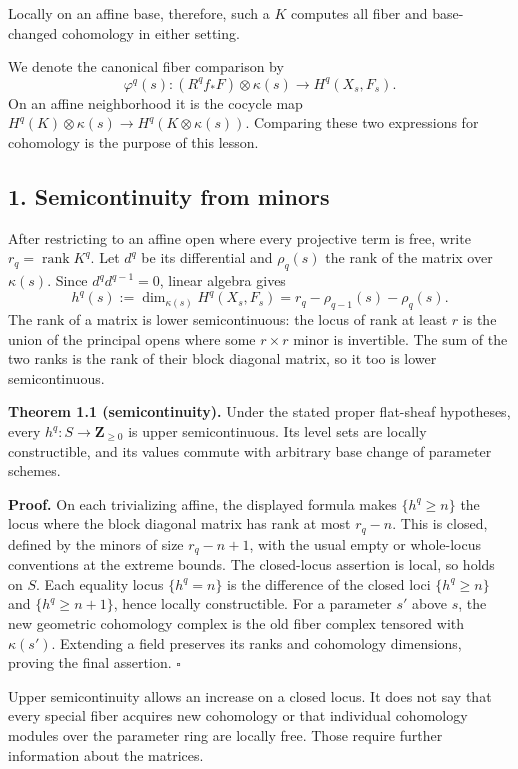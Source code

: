 \documentclass[11pt]{article}
\begin{document}
Locally on an affine base, therefore, such a \(K\) computes all fiber
and base-changed cohomology in either setting.

We denote the canonical fiber comparison by \[
\varphi^q(s):(R^qf_*F)\otimes\kappa(s)\longrightarrow H^q(X_s,F_s).
\] On an affine neighborhood it is the cocycle map
\(H^q(K)\otimes\kappa(s)\to H^q(K\otimes\kappa(s))\). Comparing these
two expressions for cohomology is the purpose of this lesson.

\subsection{1. Semicontinuity from
minors}\label{semicontinuity-from-minors}

After restricting to an affine open where every projective term is free,
write \(r_q=\operatorname{rank}K^q\). Let \(d^q\) be its differential
and \(\rho_q(s)\) the rank of the matrix over \(\kappa(s)\). Since
\(d^qd^{q-1}=0\), linear algebra gives \[
h^q(s):=\dim_{\kappa(s)}H^q(X_s,F_s)
=r_q-\rho_{q-1}(s)-\rho_q(s).
\] The rank of a matrix is lower semicontinuous: the locus of rank at
least \(r\) is the union of the principal opens where some \(r\times r\)
minor is invertible. The sum of the two ranks is the rank of their block
diagonal matrix, so it too is lower semicontinuous.

\textbf{Theorem 1.1 (semicontinuity).} Under the stated proper
flat-sheaf hypotheses, every \(h^q:S\to\mathbf Z_{\geq0}\) is upper
semicontinuous. Its level sets are locally constructible, and its values
commute with arbitrary base change of parameter schemes.

\textbf{Proof.} On each trivializing affine, the displayed formula makes
\(\{h^q\geq n\}\) the locus where the block diagonal matrix has rank at
most \(r_q-n\). This is closed, defined by the minors of size
\(r_q-n+1\), with the usual empty or whole-locus conventions at the
extreme bounds. The closed-locus assertion is local, so holds on \(S\).
Each equality locus \(\{h^q=n\}\) is the difference of the closed loci
\(\{h^q\geq n\}\) and \(\{h^q\geq n+1\}\), hence locally constructible.
For a parameter \(s'\) above \(s\), the new geometric cohomology complex
is the old fiber complex tensored with \(\kappa(s')\). Extending a field
preserves its ranks and cohomology dimensions, proving the final
assertion. \(\square\)

Upper semicontinuity allows an increase on a closed locus. It does not
say that every special fiber acquires new cohomology or that individual
cohomology modules over the parameter ring are locally free. Those
require further information about the matrices.
\end{document}
